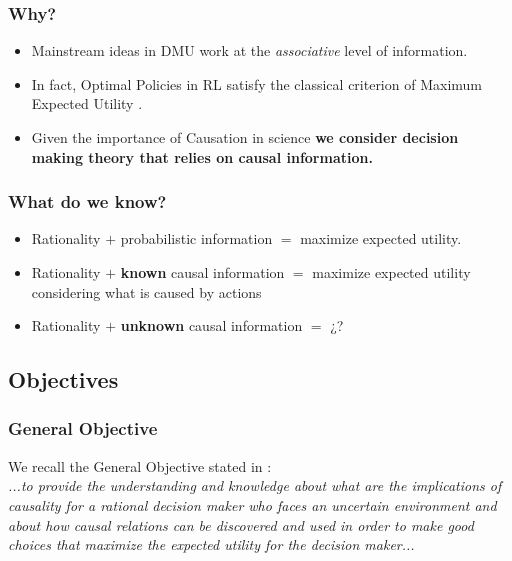 \documentclass{beamer}
\theoremstyle{plain}
\begin{document}
\begin{frame}
\frametitle{Why?}
\begin{itemize}
\item Mainstream ideas in DMU work at the \textit{associative} level of information.
\item In fact, Optimal Policies in RL satisfy the classical criterion of Maximum Expected Utility \citep{webb2007game}.
\item Given the importance of Causation in science \textbf{we consider decision making theory that relies on causal information.}
\end{itemize}
\end{frame}

\begin{frame}
\frametitle{What do we know?}
\begin{itemize}
\item Rationality $+$ probabilistic information $=$ maximize expected utility.
\item Rationality $+$ \textbf{known} causal information $=$ maximize expected utility considering what is caused by actions \citep{pearl2009causality,lattimoreNIPS2016}
\item Rationality $+$ \textbf{unknown} causal information $=$ ¿? 
\end{itemize}
\end{frame}

\subsection{Objectives}
\begin{frame}
\frametitle{General Objective}
We recall the General Objective stated in \cite{gonzalez2019causal}:
\\
\textit{...to provide the understanding and knowledge about what are the implications of causality for a rational decision maker who faces an uncertain environment and about how causal relations can be discovered and used in order to make good choices that maximize the expected utility for the decision maker...}
\end{frame}
\end{document}
